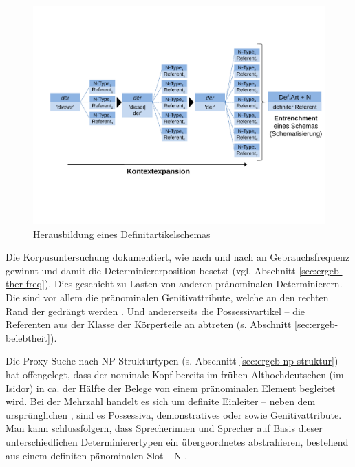 \begin{figure}
\begin{center}
  \includegraphics[width=12cm]{images/expansion.pdf}
\caption {Herausbildung eines Definitartikelschemas} 
\label{abb:entrenchment-ther}
\end{center}
\end{figure} 

Die Korpusuntersuchung  dokumentiert, wie  nach und nach an Gebrauchsfrequenz gewinnt und damit die Determiniererposition besetzt (vgl. Abschnitt \ref{sec:ergeb-ther-freq}). Dies geschieht zu Lasten von anderen pränominalen Determinierern. Die  sind vor allem die pränominalen  Genitivattribute, welche an den rechten Rand der  gedrängt werden \parencite[zur weiterführenden Diskussion s.][]{Demske2001}. Und andererseits die  Possessivartikel -- die  Referenten aus der Klasse der Körperteile an  abtreten (s. Abschnitt \ref{sec:ergeb-belebtheit}). 

Die Proxy-Suche  nach NP-Strukturtypen  (s. Abschnitt \ref{sec:ergeb-np-struktur}) hat offengelegt, dass der nominale Kopf bereits im frühen Althochdeutschen (im Isidor) in ca. der Hälfte der Belege von einem pränominalen Element begleitet wird. Bei der Mehrzahl handelt es sich um definite Einleiter -- neben dem ursprünglichen  , sind es  Possessiva, demonstratives  oder  sowie  Genitivattribute. Man kann schlussfolgern, dass Sprecherinnen und Sprecher auf Basis dieser unterschiedlichen Determinierertypen ein übergeordnetes  abstrahieren, bestehend aus einem definiten pänominalen Slot\,+\,N \parencite[ähnlich fürs Altenglische][]{Sommerer2011}. 
  
